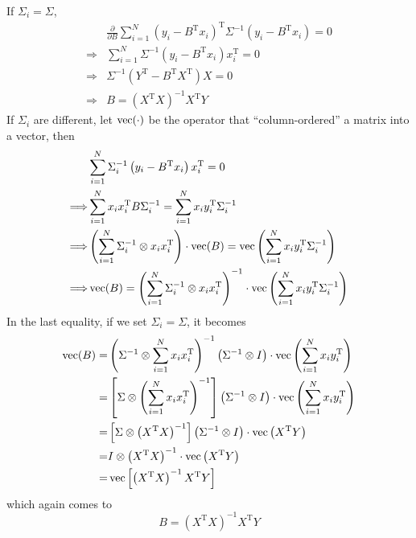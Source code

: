 \begin{sol}
If $\Sigma_i=\Sigma$,
\begin{align*}
& \frac{\partial}{\partial B}\sum_{i=1}^N\left(y_i-B^\mathrm{T}x_i\right)^\mathrm{T}\Sigma^{-1}\left(y_i-B^\mathrm{T}x_i\right)=0\\
\Longrightarrow & \sum_{i=1}^N\Sigma^{-1}\left(y_i-B^\mathrm{T}x_i\right)x_i^\mathrm{T}=0\\
\Longrightarrow & \Sigma^{-1}(Y^\mathrm{T}-B^\mathrm{T}X^\mathrm{T})X=0\\
\Longrightarrow & B=(X^\mathrm{T}X)^{-1}X^\mathrm{T}Y
\end{align*}
If $\Sigma_i$ are different, let $\operatorname{vec}(\cdot)$ be the operator that ``column-ordered'' a matrix into a vector, then
\begin{align*}
& \sum_{i=1}^N\Sigma_i^{-1}\left(y_i-B^\mathrm{T}x_i\right)x_i^\mathrm{T}=0\\
\Longrightarrow & \sum_{i=1}^{N}x_ix_i^\mathrm{T}B\Sigma_i^{-1}=\sum_{i=1}^{N}x_iy_i^\mathrm{T}\Sigma_i^{-1} \\
\Longrightarrow & \left(\sum_{i=1}^{N}\Sigma_i^{-1}\otimes x_ix_i^\mathrm{T}\right)\cdot\operatorname{vec}(B)=\operatorname{vec}\left(\sum_{i=1}^{N}x_iy_i^\mathrm{T}\Sigma_i^{-1}\right)\\
\Longrightarrow & \operatorname{vec}(B)=\left(\sum_{i=1}^{N}\Sigma_i^{-1}\otimes x_ix_i^\mathrm{T}\right)^{-1}\cdot\operatorname{vec}\left(\sum_{i=1}^{N}x_iy_i^\mathrm{T}\Sigma_i^{-1}\right)
\end{align*}
In the last equality, if we set $\Sigma_i=\Sigma$, it becomes
\begin{align*}
\operatorname{vec}(B) =& \left(\Sigma^{-1}\otimes\sum_{i=1}^{N}x_ix_i^\mathrm{T}\right)^{-1} \left(\Sigma^{-1}\otimes I\right)\cdot\operatorname{vec}\left(\sum_{i=1}^{N}x_iy_i^\mathrm{T}\right)\\
=& \left[\Sigma\otimes\left(\sum_{i=1}^{N}x_ix_i^\mathrm{T}\right)^{-1}\right] \left(\Sigma^{-1}\otimes I\right)\cdot\operatorname{vec}\left(\sum_{i=1}^{N}x_iy_i^\mathrm{T}\right)\\
=& \left[\Sigma\otimes\left(X^\mathrm{T}X\right)^{-1}\right] \left(\Sigma^{-1}\otimes I\right)\cdot\operatorname{vec}\left(X^\mathrm{T}Y\right)\\
=& I\otimes \left(X^\mathrm{T}X\right)^{-1}\cdot \operatorname{vec}\left(X^\mathrm{T}Y\right)\\
=& \operatorname{vec}\left[\left(X^\mathrm{T}X\right)^{-1}X^\mathrm{T}Y\right]
\end{align*}
which again comes to
\[
B=\left(X^\mathrm{T}X\right)^{-1}X^\mathrm{T}Y
\]
\end{sol}

